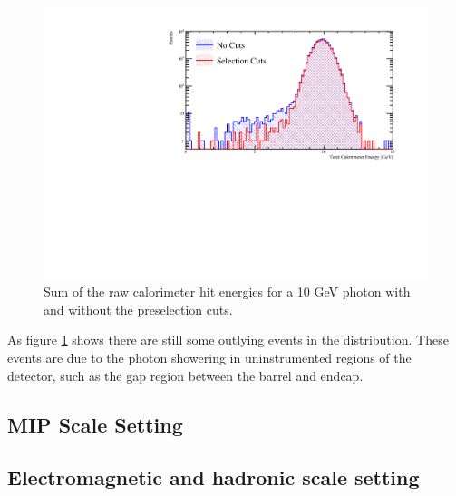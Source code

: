 \begin{figure}
\includegraphics[width=\largefigwidth]{EnergyEstimators/Plots/Calibration/Digitsation/ECal/ECalDigiCuts.pdf}
  \caption[Sum of the raw calorimeter hit energies for a 10 GeV photon with and without the preselection cuts.]{Sum of the raw calorimeter hit energies for a 10 GeV photon with and without the preselection cuts.}
  \label{engest:fig:cutsphotondigi}
\end{figure}

As figure \ref{engest:fig:cutsphotondigi} shows there are still some outlying events in the distribution.  These events are due to the photon showering in uninstrumented regions of the detector, such as the gap region between the barrel and endcap.

\subsection{MIP Scale Setting}


\subsection{Electromagnetic and hadronic scale setting}




